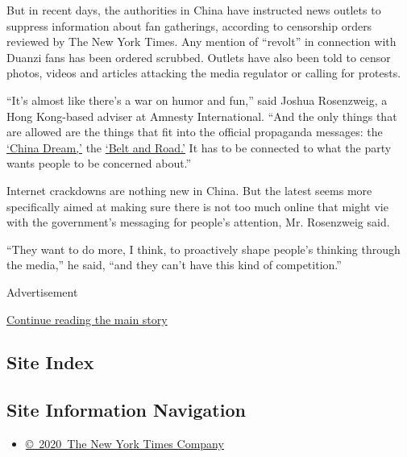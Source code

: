 But in recent days, the authorities in China have instructed news
outlets to suppress information about fan gatherings, according to
censorship orders reviewed by The New York Times. Any mention of
``revolt'' in connection with Duanzi fans has been ordered scrubbed.
Outlets have also been told to censor photos, videos and articles
attacking the media regulator or calling for protests.

``It's almost like there's a war on humor and fun,'' said Joshua
Rosenzweig, a Hong Kong-based adviser at Amnesty International. ``And
the only things that are allowed are the things that fit into the
official propaganda messages: the
\href{https://www.nytimes.com/2017/10/13/sunday-review/xi-jinping-china.html}{`China
Dream,'} the
\href{https://www.nytimes.com/2017/05/13/business/china-railway-one-belt-one-road-1-trillion-plan.html}{`Belt
and Road.'} It has to be connected to what the party wants people to be
concerned about.''

Internet crackdowns are nothing new in China. But the latest seems more
specifically aimed at making sure there is not too much online that
might vie with the government's messaging for people's attention, Mr.
Rosenzweig said.

``They want to do more, I think, to proactively shape people's thinking
through the media,'' he said, ``and they can't have this kind of
competition.''

Advertisement

\protect\hyperlink{after-bottom}{Continue reading the main story}

\hypertarget{site-index}{%
\subsection{Site Index}\label{site-index}}

\hypertarget{site-information-navigation}{%
\subsection{Site Information
Navigation}\label{site-information-navigation}}

\begin{itemize}
\tightlist
\item
  \href{https://help.nytimes.com/hc/en-us/articles/115014792127-Copyright-notice}{©~2020~The
  New York Times Company}
\end{itemize}

